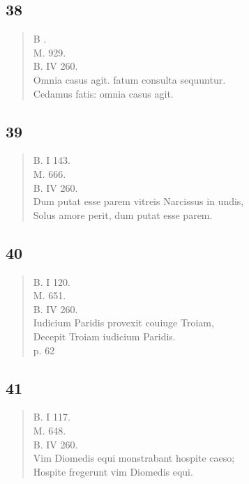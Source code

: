 \documentclass[11pt, a4paper]{report}
\begin{document}
            \subsection*{38}
      \begin{verse}
      B . \\ M. 929. \\ B. IV 260. \\ Omnia casus agit. fatum consulta sequuntur. \\ Cedamus fatis: omnia casus agit. \\ 
      \end{verse}
  
            \subsection*{39}
      \begin{verse}
      B. I 143. \\ M. 666. \\ B. IV 260. \\ Dum putat esse parem vitreis Narcissus in undis, \\ Solus amore perit, dum putat esse parem. \\ 
      \end{verse}
  
            \subsection*{40}
      \begin{verse}
      B. I 120. \\ M. 651. \\ B. IV 260. \\ Iudicium Paridis provexit couiuge Troiam, \\ Decepit Troiam iudicium Paridis. \\ p. 62 \\ 
      \end{verse}
  
            \subsection*{41}
      \begin{verse}
      B. I 117. \\ M. 648. \\ B. IV 260. \\ Vim Diomedis equi monstrabant hospite caeso; \\ Hospite fregerunt vim Diomedis equi. \\ 
      \end{verse}
  
\end{document}
